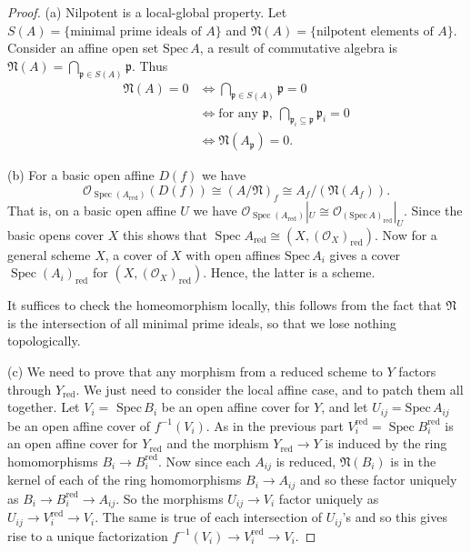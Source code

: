 \documentclass[12pt]{amsart}
\begin{document}
\begin{proof}
	(a) Nilpotent is a local-global property. Let $S(A)=\{\text{minimal prime ideals of }A\}$ and $\mathfrak{N}(A)=\{\text{nilpotent elements of }A\}$. Consider an affine open set $\mathrm{Spec}\,A$,  a result of commutative algebra is $\mathfrak{N}(A)=\bigcap _{\mathfrak{p}\in S(A)} \mathfrak{p} $. Thus
	\begin{align*}
	\mathfrak{N}(A)=0 & \iff \bigcap _{\mathfrak{p}\in S(A)} \mathfrak{p}=0 \\
	& \iff\text{for any } \mathfrak{p},\ \bigcap_{\mathfrak{p}_{i} \subseteq \mathfrak{p}}\mathfrak{p}_{i}=0 \\
	&\iff \mathfrak{N}(A_{\mathfrak{p}})=0.
	\end{align*}

(b)  For a basic open affine $D(f)$ we have $$\mathcal{O}_{\operatorname{Spec}\left(A_{\text {red}}\right)}(D(f)) \cong(A / \mathfrak{N})_{f} \cong A_{f} /\left(\mathfrak{N}\left(A_{f}\right)\right).$$  That is, on a basic open affine $U$ we have $\mathcal{O}_{\operatorname{Spec}\left(A_{\text {red}}\right)}|_{U} \cong \mathcal{O}_{(\mathrm{Spec}\, A)_{\text {red}}}|_{U}$. Since the basic opens cover $X$ this shows that $\operatorname{Spec}A_{\mathrm{r e d}} \cong\left(X,\left(\mathcal{O}_{X}\right)_{\mathrm{r e d}}\right)$.   Now for a general scheme $X$, a cover of $X$ with open affines $\mathrm{Spec}\, A_{i}$ gives a cover $\operatorname{Spec}\left(A_{i}\right)_{\text {red}}$ for $\left(X,\left(\mathcal{O}_{X}\right)_{\text {red}}\right)$. Hence, the latter is a scheme.



It suffices to check the homeomorphism locally, this follows from the fact that $\mathfrak{N}$ is the intersection of all minimal prime ideals, so that we lose nothing topologically.  


(c) We need to prove that any morphism from a reduced scheme to $Y$ factors through $Y_{\mathrm{r e d}}$. We just need to consider the local affine case,  and to patch them all together. Let $V_{i}=$ $\mathrm{Spec}\, B_{i}$ be an open affine cover for $Y$, and let $U_{i j}=\mathrm{Spec}\,A_{i j}$ be an open affine cover of $f^{-1} (V_{i})$. As in the previous part $V_{i}^{\text {red}}=\operatorname{Spec} B_{i}^{\text {red}}$ is an open affine cover for $Y_{\text {red}}$ and the morphism $Y_{\text {red}} \rightarrow Y$ is induced by the ring homomorphisms $B_{i} \rightarrow B_{i}^{\mathrm{r e d}}$. Now since each $A_{i j}$ is reduced, $\mathfrak{N}\left(B_{i}\right)$ is in the kernel of each of the ring homomorphisms $B_{i} \rightarrow A_{i j}$ and so these factor uniquely as $B_{i} \rightarrow B_{i}^{\text {red}} \rightarrow A_{i j} .$ So the morphisms $U_{i j} \rightarrow V_{i}$ factor uniquely as $U_{i j} \rightarrow V_{i}^{\text {red}} \rightarrow V_{i}$. The same is true of each intersection of $U_{i j}$'s and so this gives rise to a unique factorization $f^{-1} (V_{i}) \rightarrow V_{i}^{\text {red}} \rightarrow V_{i}$.
\end{proof}
\end{document}
